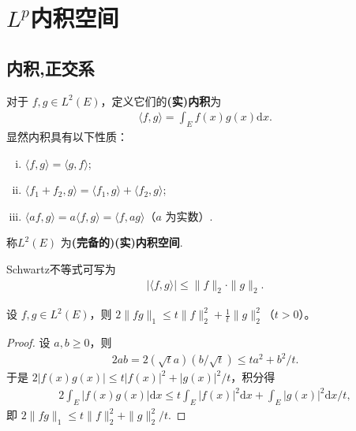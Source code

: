 \documentclass[../../main.tex]{subfiles}%
\begin{document}
\section{$L^p$内积空间}

\subsection{内积,正交系}

\begin{definition}
对于 $f, g \in L^2(E)$，定义它们的\textbf{(实)内积}为
\begin{align*}
\langle f, g \rangle = \int_E f(x) g(x) \mathrm{d}x.
\end{align*}
显然内积具有以下性质：
\begin{enumerate}[(i)]
\item $\langle f, g \rangle = \langle g, f \rangle$;
\item $\langle f_1 + f_2, g \rangle = \langle f_1, g \rangle + \langle f_2, g \rangle$;
\item $\langle af, g \rangle = a\langle f, g \rangle = \langle f, ag \rangle$（$a$ 为实数）.
\end{enumerate}
称$L^2(E)$ 为\textbf{(完备的)(实)内积空间}.
\end{definition}
\begin{remark}
Schwartz不等式可写为
\begin{align*}
|\langle f, g \rangle| \leqslant \|f\|_2 \cdot \|g\|_2.
\end{align*}
\end{remark}

\begin{example}
设 $f, g \in L^2(E)$，则 $2\|fg\|_1 \leqslant t\|f\|_2^2 + \frac{1}{t}\|g\|_2^2$（$t>0$）。
\end{example}
\begin{proof}

设 $a, b \geqslant 0$，则
\begin{align*}
2ab = 2(\sqrt{t}a)(b/\sqrt{t}) \leqslant ta^2 + b^2/t.
\end{align*}
于是 $2|f(x)g(x)| \leqslant t|f(x)|^2 + |g(x)|^2/t$，积分得
\begin{align*}
2\int_E |f(x)g(x)| \mathrm{d}x \leqslant t\int_E |f(x)|^2 \mathrm{d}x + \int_E |g(x)|^2 \mathrm{d}x / t,
\end{align*}
即 $2\|fg\|_1 \leqslant t\|f\|_2^2 + \|g\|_2^2 / t$.

\end{proof}
\end{document}
